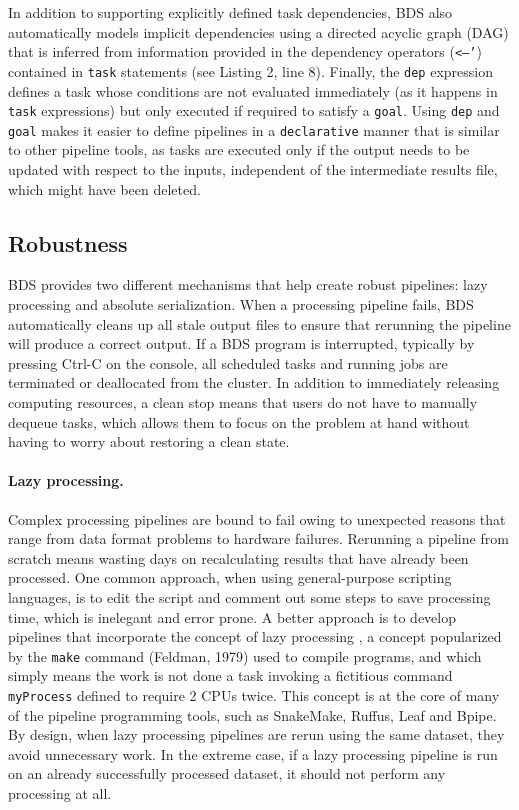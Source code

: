In addition to supporting explicitly defined task dependencies, BDS also automatically models implicit dependencies using a directed acyclic graph (DAG) that is inferred from information provided in the dependency operators (\texttt{<–’}) contained in \texttt{task} statements (see Listing 2, line 8). Finally, the \texttt{dep} expression defines a task whose conditions are not evaluated immediately (as it happens in \texttt{task} expressions) but only executed if required to satisfy a \texttt{goal}. Using \texttt{dep} and \texttt{goal} makes it easier to define pipelines in a \texttt{declarative} manner that is similar to other pipeline tools, as tasks are executed only if the output needs to be updated with respect to the inputs, independent of the intermediate results file, which might have been deleted.

\subsection{Robustness}

BDS provides two different mechanisms that help create robust pipelines: lazy processing and absolute serialization. When a processing pipeline fails, BDS automatically cleans up all stale output files to ensure that rerunning the pipeline will produce a correct output. If a BDS program is interrupted, typically by pressing Ctrl-C on the console, all scheduled tasks and running jobs are terminated or deallocated from the cluster. In addition to immediately releasing computing resources, a clean stop means that users do not have to manually dequeue tasks, which allows them to focus on the problem at hand without having to worry about restoring a clean state.

\paragraph{Lazy processing.} Complex processing pipelines are bound to fail owing to unexpected reasons that range from data format problems to hardware failures. Rerunning a pipeline from scratch means wasting days on recalculating results that have already been processed. One common approach, when using general-purpose scripting languages, is to edit the script and comment out some steps to save processing time, which is inelegant and error prone. A better approach is to develop pipelines that incorporate the concept of lazy processing \cite{Napolitano2013}, a concept popularized by the \texttt{make} command (Feldman, 1979) used to compile programs, and which simply means the work is not done a task invoking a fictitious command \texttt{myProcess} defined to require 2 CPUs twice. This concept is at the core of many of the pipeline programming tools, such as SnakeMake, Ruffus, Leaf and Bpipe. By design, when lazy processing pipelines are rerun using the same dataset, they avoid unnecessary work. In the extreme case, if a lazy processing pipeline is run on an already successfully processed dataset, it should not perform any processing at all.

